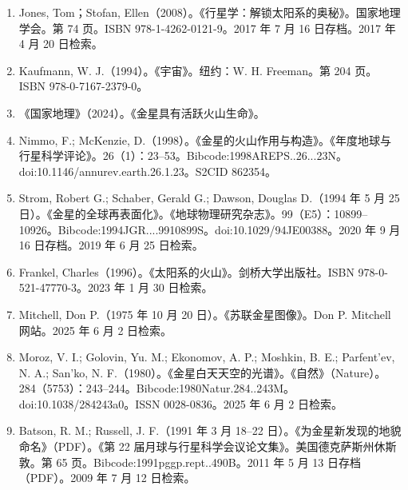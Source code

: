 \begin{enumerate}
\item Jones, Tom；Stofan, Ellen（2008）。《行星学：解锁太阳系的奥秘》。国家地理学会。第 74 页。ISBN 978-1-4262-0121-9。2017 年 7 月 16 日存档。2017 年 4 月 20 日检索。
\item Kaufmann, W. J.（1994）。《宇宙》。纽约：W. H. Freeman。第 204 页。ISBN 978-0-7167-2379-0。
\item 《国家地理》（2024）。《金星具有活跃火山生命》。
\item Nimmo, F.; McKenzie, D.（1998）。《金星的火山作用与构造》。《年度地球与行星科学评论》。26（1）：23–53。Bibcode:1998AREPS..26...23N。doi:10.1146/annurev.earth.26.1.23。S2CID 862354。
\item Strom, Robert G.; Schaber, Gerald G.; Dawson, Douglas D.（1994 年 5 月 25 日）。《金星的全球再表面化》。《地球物理研究杂志》。99（E5）：10899–10926。Bibcode:1994JGR....9910899S。doi:10.1029/94JE00388。2020 年 9 月 16 日存档。2019 年 6 月 25 日检索。
\item Frankel, Charles（1996）。《太阳系的火山》。剑桥大学出版社。ISBN 978-0-521-47770-3。2023 年 1 月 30 日检索。
\item Mitchell, Don P.（1975 年 10 月 20 日）。《苏联金星图像》。Don P. Mitchell 网站。2025 年 6 月 2 日检索。
\item Moroz, V. I.; Golovin, Yu. M.; Ekonomov, A. P.; Moshkin, B. E.; Parfent'ev, N. A.; San'ko, N. F.（1980）。《金星白天天空的光谱》。《自然》（Nature）。284（5753）：243–244。Bibcode:1980Natur.284..243M。doi:10.1038/284243a0。ISSN 0028-0836。2025 年 6 月 2 日检索。
\item Batson, R. M.; Russell, J. F.（1991 年 3 月 18–22 日）。《为金星新发现的地貌命名》（PDF）。《第 22 届月球与行星科学会议论文集》。美国德克萨斯州休斯敦。第 65 页。Bibcode:1991pggp.rept..490B。2011 年 5 月 13 日存档（PDF）。2009 年 7 月 12 日检索。


\end{enumerate}